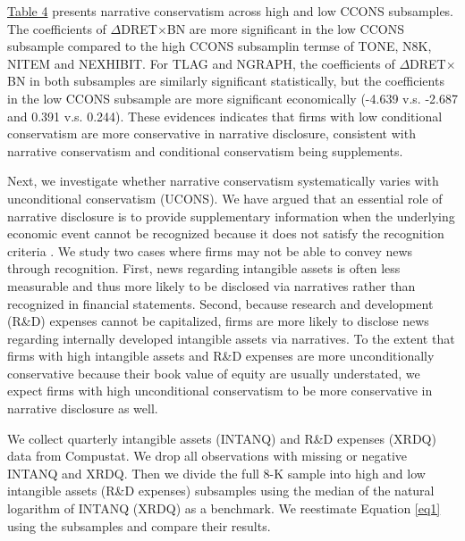 \documentclass[letterpaper,12pt]{article}
\begin{document}
\begin{spacing}{1.5}
\hyperref[T4]{Table 4} presents narrative conservatism across high and low CCONS subsamples. The coefficients of $\Delta$DRET$\times$BN are more significant in the low CCONS subsample compared to the high CCONS subsamplin termse  of TONE, N8K, NITEM and NEXHIBIT. For TLAG and NGRAPH, the coefficients of $\Delta$DRET$\times$BN in both subsamples are similarly significant statistically, but the coefficients in the low CCONS subsample are more significant economically (-4.639 v.s. -2.687 and 0.391 v.s. 0.244). These evidences indicates that firms with low conditional conservatism are more conservative in narrative disclosure, consistent with narrative conservatism and conditional conservatism being supplements.


Next, we investigate whether narrative conservatism systematically varies with unconditional conservatism (UCONS). We have argued that an essential role of narrative disclosure is to provide supplementary information when the underlying economic event cannot be recognized because it does not satisfy the recognition criteria \cite{fasbStatementFinancialAccounting1984}. We study two cases where firms may not be able to convey news through recognition. First, news regarding intangible assets is often less measurable and thus more likely to be disclosed via narratives rather than recognized in financial statements. Second, because research and development (R\&D) expenses cannot be capitalized, firms are more likely to disclose news regarding internally developed intangible assets via narratives. To the extent that firms with high intangible assets and R\&D expenses are more unconditionally conservative because their book value of equity are usually understated, we expect firms with high unconditional conservatism to be more conservative in narrative disclosure as well.

We collect quarterly intangible assets (INTANQ) and R\&D expenses (XRDQ) data from Compustat. We drop all observations with missing or negative INTANQ and XRDQ. Then we divide the full 8-K sample into high and low intangible assets (R\&D expenses) subsamples using the median of the natural logarithm of INTANQ (XRDQ) as a benchmark. We reestimate Equation \eqref{eq1} using the subsamples and compare their results.


\end{spacing}
\end{document}

